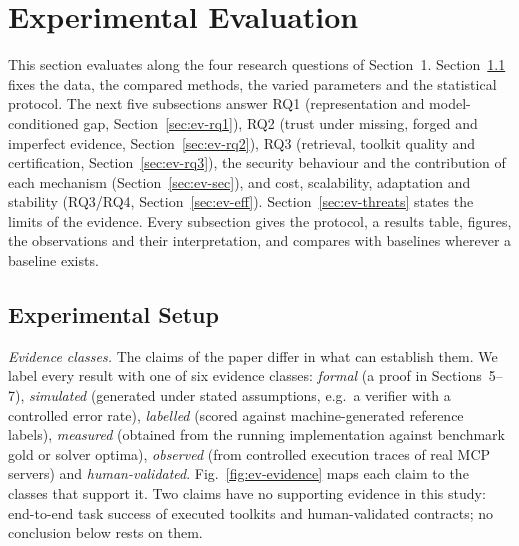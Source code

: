 \section{Experimental Evaluation}
\label{sec:ev}

This section evaluates \pamcp{} along the four research questions of Section~1. Section~\ref{sec:ev-setup} fixes
the data, the compared methods, the varied parameters and the statistical protocol. The next five subsections
answer RQ1 (representation and model-conditioned gap, Section~\ref{sec:ev-rq1}), RQ2 (trust under missing, forged
and imperfect evidence, Section~\ref{sec:ev-rq2}), RQ3 (retrieval, toolkit quality and certification,
Section~\ref{sec:ev-rq3}), the security behaviour and the contribution of each mechanism
(Section~\ref{sec:ev-sec}), and cost, scalability, adaptation and stability (RQ3/RQ4,
Section~\ref{sec:ev-eff}). Section~\ref{sec:ev-threats} states the limits of the evidence. Every subsection
gives the protocol, a results table, figures, the observations and their interpretation, and compares
\pamcp{} with baselines wherever a baseline exists.

\subsection{Experimental Setup}
\label{sec:ev-setup}

\emph{Evidence classes.} The claims of the paper differ in what can establish them. We label every result with
one of six evidence classes: \emph{formal} (a proof in Sections~5--7), \emph{simulated} (generated under stated
assumptions, e.g.\ a verifier with a controlled error rate), \emph{labelled} (scored against machine-generated
reference labels), \emph{measured} (obtained from the running implementation against benchmark gold or solver
optima), \emph{observed} (from controlled execution traces of real MCP servers) and \emph{human-validated}.
Fig.~\ref{fig:ev-evidence} maps each claim to the classes that support it. Two claims have no supporting
evidence in this study: end-to-end task success of executed toolkits and human-validated contracts; no
conclusion below rests on them.

